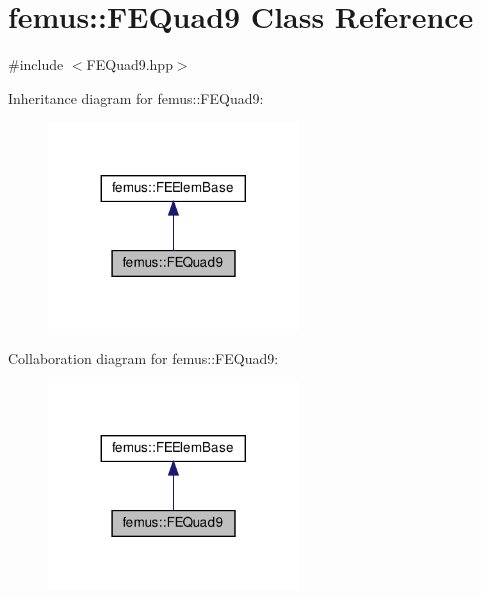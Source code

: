 \hypertarget{classfemus_1_1_f_e_quad9}{}\section{femus\+:\+:F\+E\+Quad9 Class Reference}
\label{classfemus_1_1_f_e_quad9}


{\ttfamily \#include $<$F\+E\+Quad9.\+hpp$>$}



Inheritance diagram for femus\+:\+:F\+E\+Quad9\+:
\nopagebreak
\begin{figure}[H]
\begin{center}
\leavevmode
\includegraphics[width=188pt]{classfemus_1_1_f_e_quad9__inherit__graph}
\end{center}
\end{figure}


Collaboration diagram for femus\+:\+:F\+E\+Quad9\+:
\nopagebreak
\begin{figure}[H]
\begin{center}
\leavevmode
\includegraphics[width=188pt]{classfemus_1_1_f_e_quad9__coll__graph}
\end{center}
\end{figure}
